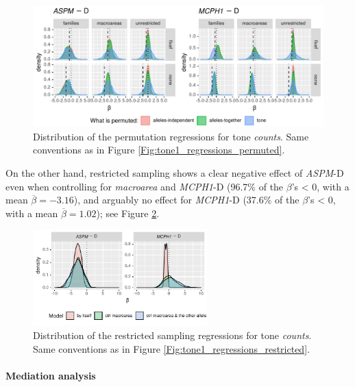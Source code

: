 \documentclass[twoside,onecolumn]{article}
\begin{document}
\begin{figure}[h]
  \centering
  \includegraphics[width=\textwidth]{../../code/figures/tone_counts_regressions_permuted}
  \caption{Distribution of the permutation regressions for tone \textit{counts}. Same conventions as in Figure \ref{Fig:tone1_regressions_permuted}.}
  \label{Fig:tone_counts_regressions_permuted}
\end{figure}

On the other hand, restricted sampling shows a clear negative effect of \textit{ASPM}-D even when controlling for \textit{macroarea} and \textit{MCPH1}-D (96.7\% of the $\beta$'s < 0, with a mean $\overline{\beta} = -3.16$), and arguably no effect for \textit{MCPH1}-D (37.6\% of the $\beta$'s < 0, with a mean $\overline{\beta} = 1.02$); see Figure \ref{Fig:tone_counts_regressions_restricted}.

\begin{figure}[h]
  \centering
  \includegraphics[width=0.6\textwidth]{../../code/figures/tone_counts_regressions_restricted}
  \caption{Distribution of the restricted sampling regressions for tone \textit{counts}. Same conventions as in Figure \ref{Fig:tone1_regressions_restricted}.}
  \label{Fig:tone_counts_regressions_restricted}
\end{figure}


\paragraph{Mediation analysis}
\end{document}
